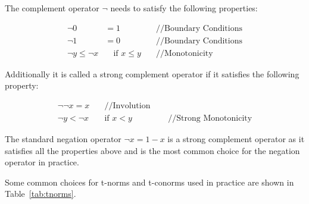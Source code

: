 
The complement operator $\neg$ needs to satisfy the following properties:

\begin{align*}
      \neg 0             & = 1                       & \quad \text{//Boundary Conditions} \\
      \neg 1             & = 0                       & \quad \text{//Boundary Conditions} \\
      \neg y \leq \neg x & \quad \text{if } x \leq y & \quad \text{//Monotonicity}
\end{align*}

Additionally it is called a strong complement operator if it satisfies the following property:

\begin{align}
      \neg \neg x = x & \quad \text{//Involution}                                       \\
      \neg y < \neg x & \quad \text{if } x < y    & \quad \text{ //Strong Monotonicity}
\end{align}


The standard negation operator $\neg x = 1 - x$ is a strong complement operator as it satisfies all the properties above and is the most common choice for the negation operator in practice.

Some common choices for t-norms and t-conorms used in practice are shown in Table~\ref{tab:tnorms}.

